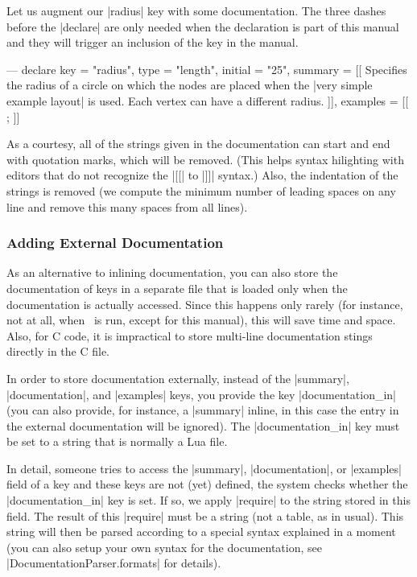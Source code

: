 Let us augment our |radius| key with some documentation. The three
dashes before the |declare| are only needed when the declaration is
part of this manual and they will trigger an inclusion of the key in
the manual.

\begin{codeexample}
--- 
declare {
  key = "radius",
  type = "length",
  initial = "25",
  summary = [[
    Specifies the radius of a circle on which the nodes are placed when
    the |very simple example layout| is used. Each vertex can have a
    different radius.
  ]],
  examples = [[
    \tikz {};
  ]]
}
\end{codeexample}

As a courtesy, all of the strings given in the documentation can start
and end with quotation marks, which will be removed. (This helps
syntax hilighting with editors that do not recognize the |[[| to |]]|
syntax.) Also, the indentation of the strings is removed (we compute
the minimum number of leading spaces on any line and remove this many
spaces from all lines).



\subsubsection{Adding External Documentation}

As an alternative to inlining documentation, you can also store the
documentation of keys in a separate file that is loaded only when the
documentation is actually accessed. Since this happens only rarely
(for instance, not at all, when \tikzname\ is run, except for this
manual), this will save time and space. Also, for C code, it is
impractical to store multi-line documentation stings directly in the C
file.

In order to store documentation externally, instead of the |summary|,
|documentation|, and |examples| keys, you provide the key
|documentation_in| (you can also provide, for instance, a |summary|
inline, in this case the entry in the external documentation will be
ignored). The |documentation_in| key must be set to a string that is
normally a Lua file.

In detail, someone tries to access the |summary|, |documentation|, or
|examples| field of a key and these keys are not (yet) defined, the
system checks whether the |documentation_in| key is set. If so, we
apply |require| to the string stored in this field. The result of this
|require| must be a string (not a table, as in usual). This string
will then be parsed according to a special syntax explained in a
moment (you can also setup your own syntax for the documentation, see
|DocumentationParser.formats| for details).

